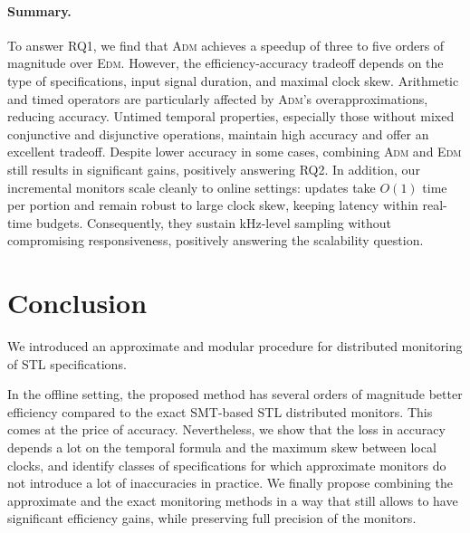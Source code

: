 \documentclass[iicol,lineno]{sn-jnl}
\newcommand{\?}{\text{?}}
\begin{document}
		\paragraph*{Summary.}
		To answer RQ1, we find that \textsc{Adm} achieves a speedup of three to five orders of magnitude over \textsc{Edm}. However, the efficiency-accuracy tradeoff depends on the type of specifications, input signal duration, and maximal clock skew. Arithmetic and timed operators are particularly affected by \textsc{Adm}'s overapproximations, reducing accuracy. Untimed temporal properties, especially those without mixed conjunctive and disjunctive operations, maintain high accuracy and offer an excellent tradeoff. Despite lower accuracy in some cases, combining \textsc{Adm} and \textsc{Edm} still results in significant gains, positively answering RQ2.
		In addition, our incremental monitors scale cleanly to online settings: updates take $O(1)$ time per portion and remain robust to large clock skew, keeping latency within real-time budgets. Consequently, they sustain kHz-level sampling without compromising responsiveness, positively answering the scalability question.
		
		
	\section{Conclusion} \label{sec:conclusion}
	
	We introduced an approximate and modular procedure for distributed monitoring of STL specifications.
	
	In the offline setting, the proposed method has several orders of magnitude better efficiency compared to the exact SMT-based STL distributed monitors. This comes at the price of accuracy. Nevertheless, we show that the loss in accuracy depends a lot on the temporal formula and the maximum skew between local clocks, and identify classes of specifications for which approximate monitors do not introduce a lot of inaccuracies in practice. We finally propose combining the approximate and the exact monitoring methods in a way that still allows to have significant efficiency gains, while preserving full precision of the monitors.
	
\end{document}
